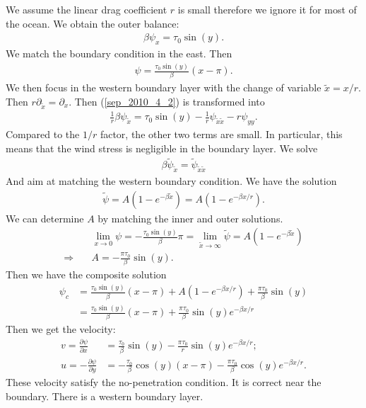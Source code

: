 \documentclass[11pt,letterpaper]{book}
\theoremstyle{definition}
\newcommand{\pe}{\partial}
\newcommand{\thus}{\Rightarrow \quad }
\begin{document}
We assume the linear drag coefficient $r$ is small therefore we ignore it for most of the ocean. We obtain the outer balance:
\begin{align*}
\beta\psi_x = \tau_0\sin(y).
\end{align*}
We match the boundary condition in the east. Then
\begin{align*}
\psi = \frac{\tau_0\sin(y)}{\beta}(x-\pi).
\end{align*}
We then focus in the western boundary layer with the change of variable $\tilde{x} = x/r$. Then $r\pe_{\tilde{x}} = \pe_{x}$. Then (\ref{sep_2010_4_2}) is transformed into
\begin{align*}
\frac{1}{r}\beta\psi_{\tilde{x}} = \tau_0\sin(y)-\frac{1}{r}\psi_{{\tilde{x}}{\tilde{x}}}-r\psi_{yy}.
\end{align*}
Compared to the $1/r$ factor, the other two terms are small. In particular, this means that the wind stress is negligible in the boundary layer. We solve
\begin{align*}
\beta\tilde\psi_{\tilde{x}} = \tilde\psi_{{\tilde{x}}{\tilde{x}}}
\end{align*}
And aim at matching the western boundary condition. We have the solution
\begin{align*}
\tilde\psi = A(1-e^{-\beta \tilde x}) = A(1-e^{-\beta x/r}).
\end{align*}
We can determine $A$ by matching the inner and outer solutions. 
\begin{align*}
&\lim_{x\to 0}\psi = -\frac{\tau_0\sin(y)}{\beta}\pi = \lim_{\tilde{x}\to \infty}\tilde{\psi} = A(1-e^{-\beta \tilde x})\\
\thus &A = -\frac{\pi\tau_0}{\beta}\sin(y).
\end{align*}
Then we have the composite solution
\begin{align*}
\psi_c &= \frac{\tau_0\sin(y)}{\beta}(x-\pi)+A(1-e^{-\beta x/r})+\frac{\pi\tau_0}{\beta}\sin(y)\\
&= \frac{\tau_0\sin(y)}{\beta}(x-\pi)+\frac{\pi\tau_0}{\beta}\sin(y)e^{-\beta x/r}
\end{align*}
Then we get the velocity:
\begin{align*}
v = \frac{\pe\psi}{\pe x} &= \frac{\tau_0}{\beta}\sin(y)-\frac{\pi\tau_0}{r}\sin(y)e^{-\beta x/r};\\
u = -\frac{\pe\psi}{\pe y} &= -\frac{\tau_0}{\beta}\cos(y)(x-\pi)-\frac{\pi\tau_0}{\beta}\cos(y)e^{-\beta x/r}.
\end{align*}
These velocity satisfy the no-penetration condition. It is correct near the boundary. There is a western boundary layer.
\end{document}
